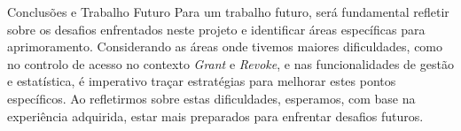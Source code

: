 \documentclass[compress,svgnames,handout,13.7pt]{beamer}
\begin{document}
\begin{frame}{Conclus\~{o}es e Trabalho Futuro}
   Para um trabalho futuro, será fundamental refletir sobre os desafios enfrentados neste projeto e identificar áreas específicas para aprimoramento. Considerando as áreas onde tivemos maiores dificuldades, como no controlo de acesso no contexto \textit{Grant} e \textit{Revoke}, e nas funcionalidades de gestão e estatística, é imperativo traçar estratégias para melhorar estes pontos específicos. Ao refletirmos sobre estas dificuldades, esperamos, com base na experiência adquirida, estar mais preparados para enfrentar desafios futuros.
\end{frame}

\thispagestyle{empty}
\frame{\titlepage}
\end{document}
